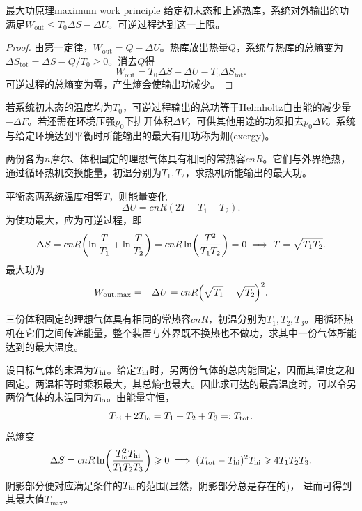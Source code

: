 \begin{theorem}
	{最大功原理}{maximum work principle}
	给定初末态和上述热库，系统对外输出的功满足$W_{\mathrm{out}} \leq T_0\Delta S - \Delta U$。可逆过程达到这一上限。
\end{theorem}

\begin{proof}
	由第一定律，$W_{\mathrm{out}} = Q - \Delta U$。热库放出热量$Q$，系统与热库的总熵变为$\Delta S_{\mathrm{tot}} = \Delta S - Q/T_0 \geq 0$。消去$Q$得
	\[
		W_{\mathrm{out}} = T_0\Delta S - \Delta U - T_0\Delta S_{\mathrm{tot}} .
	\]
	可逆过程的总熵变为零，产生熵会使输出功减少。
\end{proof}

\begin{corollary}
	若系统初末态的温度均为$T_0$，可逆过程输出的总功等于Helmholtz自由能的减少量$-\Delta F$。若还需在环境压强$p_0$下排开体积$\Delta V$，可供其他用途的功须扣去$p_0\Delta V$。系统与给定环境达到平衡时所能输出的最大有用功称为㶲(exergy)。
\end{corollary}

\begin{example}{}{}
	两份各为$n$摩尔、体积固定的理想气体具有相同的常热容$cnR$。它们与外界绝热，通过循环热机交换能量，初温分别为$T_1,T_2$，求热机所能输出的最大功。

	平衡态两系统温度相等$T$，则能量变化
	\[
		\Delta U = cnR(2T - T_1 - T_2).
	\]
	为使功最大，应为可逆过程，即
	\[
		\Delta S = cnR\biggl(\ln\frac T{T_1} + \ln\frac T{T_2}\biggr) = cnR\ln\biggl(\frac{T^2}{T_1T_2}\biggr) = 0
		\implies T = \sqrt{T_1T_2}.
	\]
	最大功为
	\begin{equation}
		\label{eq:sm-maximum-work-two-reservoirs}
		W_{\mathrm{out,max}} = -\Delta U = cnR\Bigl(\sqrt{T_1} - \sqrt{T_2}\Bigr)^2.
	\end{equation}
\end{example}
\begin{example}{}{}
	三份体积固定的理想气体具有相同的常热容$cnR$，初温分别为$T_1,T_2,T_3$。用循环热机在它们之间传递能量，整个装置与外界既不换热也不做功，求其中一份气体所能达到的最大温度。

	设目标气体的末温为$T_{\mathrm{hi}}$。给定$T_{\mathrm{hi}}$时，另两份气体的总内能固定，因而其温度之和固定。两温相等时乘积最大，其总熵也最大。因此求可达的最高温度时，可以令另两份气体的末温同为$T_{\mathrm{lo}}$。由能量守恒，
	\[
		T_{\mathrm{hi}} + 2T_{\mathrm{lo}} = T_1 + T_2 + T_3 =: T_{\mathrm{tot}}.
	\]
	总熵变
	\[
		\Delta S = cnR\ln\biggl(\frac{T_{\mathrm{lo}}^2T_{\mathrm{hi}}}{T_1T_2T_3}\biggr) \geqslant 0
		\implies (T_{\mathrm{tot}} - T_{\mathrm{hi}})^2T_{\mathrm{hi}} \geqslant 4T_1T_2T_3.
	\]
	阴影部分便对应满足条件的$T_{\mathrm{hi}}$的范围(显然，阴影部分总是存在的)，
	进而可得到其最大值$T_{\max}$。
	\begin{notecaptionblock}
	\end{notecaptionblock}
\end{example}

